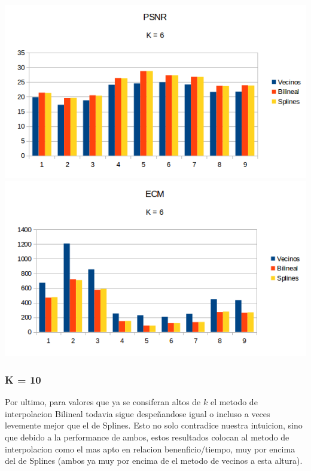 \begin{center}
\includegraphics[scale=0.50]{imagenes/K6PSNR.png}
\includegraphics[scale=0.50]{imagenes/K6ECM.png}
\end{center}

\subsubsection{K = 10}
Por ultimo, para valores que ya se consiferan altos de $k$ el metodo de interpolacion Bilineal todavia sigue despe\~nandose igual o incluso a veces levemente mejor que el de Splines. Esto no solo contradice nuestra intuicion, sino que debido a la performance de ambos, estos resultados colocan al metodo de interpolacion como el mas apto en relacion benenficio/tiempo, muy por encima del de Splines (ambos ya muy por encima de el metodo de vecinos a esta altura).

